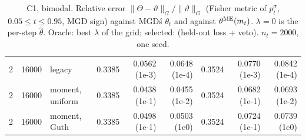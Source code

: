 \begin{table}[h]
\begin{tabular}{@{}rrlrrrrrr@{}}
2 & 16000 & legacy & 0.3385 & 0.0562 (1e-3) & 0.0648 (1e-4) & 0.3524 & 0.0770 (1e-3) & 0.0842 (1e-4)\\
2 & 16000 & moment, uniform & 0.3385 & 0.0438 (1e-1) & 0.0455 (1e-2) & 0.3524 & 0.0682 (1e-1) & 0.0693 (1e-2)\\
2 & 16000 & moment, Guth & 0.3385 & 0.0498 (1e-1) & 0.0503 (1e0) & 0.3524 & 0.0724 (1e-1) & 0.0739 (1e0)\\
\bottomrule\end{tabular}
\caption{C1, bimodal. Relative error $\|\Theta-\vartheta\|_{G}/\|\vartheta\|_G$ (Fisher metric of $p^\sigma_t$, $0.05\le t\le0.95$, MGD sign) against MGD\'s $\theta_t$ and against $\theta^{\rm ME}(m_t)$. $\lambda{=}0$ is the per-step $\hat\theta$. Oracle: best $\lambda$ of the grid; selected:  (held-out loss + veto). $n_t=2000$, one seed.}\label{tab:C1}
\end{table}

